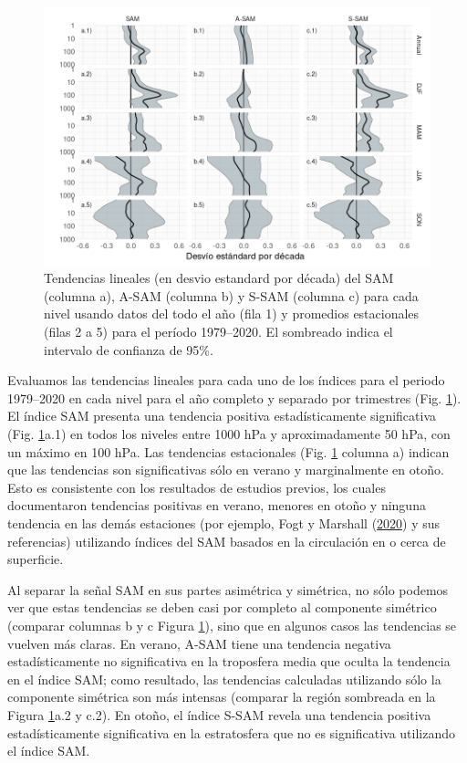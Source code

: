 \documentclass[12pt,oneside,a4paper]{reedthesis}
\begin{document}
\begin{figure}

{\centering \includegraphics{figures/30-sam/trends-1} 

}

\caption{Tendencias lineales (en desvio estandard por década) del SAM (columna a), A-SAM (columna b) y S-SAM (columna c) para cada nivel usando datos del todo el año (fila 1) y promedios estacionales (filas 2 a 5) para el período 1979--2020. El sombreado indica el intervalo de confianza de 95\%.}\label{fig:trends}
\end{figure}

Evaluamos las tendencias lineales para cada uno de los índices para el periodo 1979--2020 en cada nivel para el año completo y separado por trimestres (Fig. \ref{fig:trends}).
El índice SAM presenta una tendencia positiva estadísticamente significativa (Fig. \ref{fig:trends}a.1) en todos los niveles entre 1000 hPa y aproximadamente 50 hPa, con un máximo en 100 hPa.
Las tendencias estacionales (Fig. \ref{fig:trends} columna a) indican que las tendencias son significativas sólo en verano y marginalmente en otoño.
Esto es consistente con los resultados de estudios previos, los cuales documentaron tendencias positivas en verano, menores en otoño y ninguna tendencia en las demás estaciones (por ejemplo, Fogt y Marshall (\protect\hyperlink{ref-fogt2020}{2020}) y sus referencias) utilizando índices del SAM basados en la circulación en o cerca de superficie.

Al separar la señal SAM en sus partes asimétrica y simétrica, no sólo podemos ver que estas tendencias se deben casi por completo al componente simétrico (comparar columnas b y c Figura \ref{fig:trends}), sino que en algunos casos las tendencias se vuelven más claras.
En verano, A-SAM tiene una tendencia negativa estadísticamente no significativa en la troposfera media que oculta la tendencia en el índice SAM; como resultado, las tendencias calculadas utilizando sólo la componente simétrica son más intensas (comparar la región sombreada en la Figura \ref{fig:trends}a.2 y c.2).
En otoño, el índice S-SAM revela una tendencia positiva estadísticamente significativa en la estratosfera que no es significativa utilizando el índice SAM.
\end{document}
